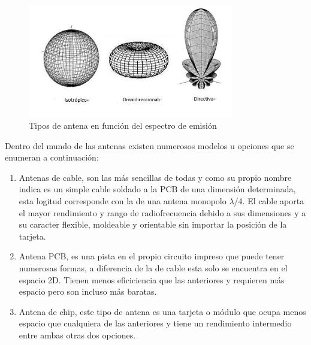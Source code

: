 \documentclass[a4paper ,12pt, onecolumn]{article}
\begin{document}
            \begin{center}
                \begin{figure}[h]
                    \centering
                    \includegraphics[width=0.8\textwidth]{antenna_types.PNG}
                    \caption{Tipos de antena en función del espectro de emisión}
                    \label{fig:mesh10}
                \end{figure}
            \end{center}
            Dentro del mundo de las antenas existen numerosos modelos u opciones que se enumeran a continuación:
            \begin{enumerate}
                \item Antenas de cable, son las más sencillas de todas y como su propio nombre indica es un simple cable soldado a la PCB de una dimensión determinada, esta logitud corresponde con la de una antena monopolo $\lambda$/4. El cable aporta el mayor rendimiento y rango de radiofrecuencia debido a sus dimensiones y a su caracter flexible, moldeable y orientable sin importar  la posición de la tarjeta.
                \item Antena PCB, es una pista en el propio circuito impreso que puede tener numerosas formas, a diferencia de la de cable esta solo se encuentra en el espacio 2D. Tienen menos eficiciencia que las anteriores y requieren más espacio pero son incluso más baratas.
                \item Antena de chip, este tipo de antena es una tarjeta o módulo que ocupa menos espacio que cualquiera de las anteriores y tiene un rendimiento intermedio entre ambas otras dos opciones.
            \end{enumerate}
\end{document}
